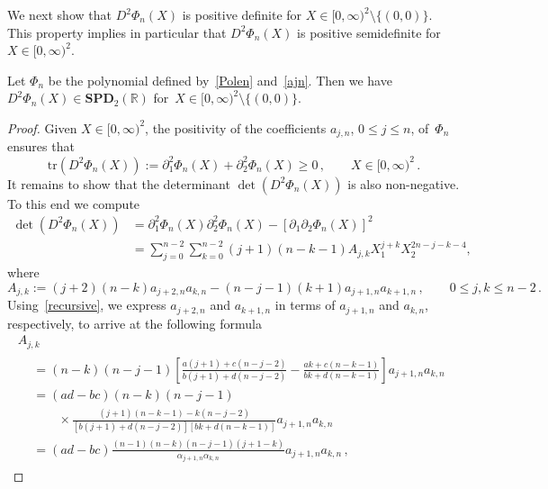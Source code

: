 \documentclass[AHL,Unicode,longabstracts,published]{cedram}
\newcommand{\bbR}{\mathbb{R}}
\newcommand{\bSPD}{\mathbf{SPD}}
\newcommand{\trr}{\mathrm{tr}}
\begin{document}
We next show that ${D^2\Phi_n(X)}$ is positive definite for $X\in[0,\infty)^2\setminus\{(0,0)\}$. This property implies in particular that ${D^2\Phi_n(X)}$ is positive semidefinite for $X\in[0,\infty)^2$.


\begin{lemm}\label{lem.p2}
Let $\Phi_n$ be the polynomial defined by~\eqref{Polen} and~\eqref{ajn}. Then we have~$D^2\Phi_n(X)\in \bSPD_2(\bbR)$ for~${X\in [0,\infty)^2\setminus\{(0,0)\}}$.
\end{lemm}


\begin{proof}
Given $X\in [0,\infty)^2$, the positivity of the coefficients $a_{j,n}$, $0\leq j\leq n$, of~$\Phi_n$ ensures that
\begin{equation*}
\trr(D^2\Phi_n(X)) := \partial_1^2 \Phi_n(X) + \partial_2^2 \Phi_n(X) \ge 0\,, \qquad X\in [0,\infty)^2\,.
\end{equation*}
It remains to show that the determinant $\det(D^2\Phi_n(X))$ is also non-negative. To this end we compute
\begin{equation}\label{lf07}
\begin{split}
\det(D^2\Phi_n(X)) & = \partial_1^2 \Phi_n(X) \partial_2^2 \Phi_n(X) - [\partial_1 \partial_2 \Phi_n(X)]^2 \\
& = \sum_{j=0}^{n-2} \sum_{k=0}^{n-2} (j+1)(n-k-1) A_{j,k} X_1^{j+k} X_2^{2n-j-k-4}, 
\end{split}
\end{equation}
where
\begin{equation*}
A_{j,k} := (j+2)(n-k) a_{j+2,n} a_{k,n} - (n-j-1)(k+1) a_{j+1,n} a_{k+1,n}\,, \qquad 0 \le j,k \le n-2\,.
\end{equation*}
Using~\eqref{recursive}, we express $a_{j+2,n}$ and $a_{k+1,n}$ in terms of $a_{j+1,n}$ and $a_{k,n}$, respectively, to arrive at the following formula
\begin{multline}\label{Ajk}
A_{j,k}\\
\begin{aligned}
&= (n-k)(n-j-1) \left[\frac{a(j+1)+c(n-j-2)}{b(j+1)+d(n-j-2)} - \frac{ak+c(n-k-1)}{bk+d(n-k-1)}\right] a_{j+1,n} a_{k,n}\\[1ex]
&= (ad-bc)(n-k)(n-j-1) \\[1ex] &\qquad\times\frac{(j+1)(n-k-1)-k(n-j-2)}{\left[b(j+1)+d(n-j-2)\right] \left[bk+d(n-k-1)\right]} a_{j+1,n} a_{k,n} \\[1ex]
&= (ad-bc)\frac{(n-1)(n-k)(n-j-1)(j+1-k)}{\alpha_{j+1,n}\alpha_{k,n}} a_{j+1,n} a_{k,n}\,,
\end{aligned}

\end{multline}
\end{proof}
\end{document}

